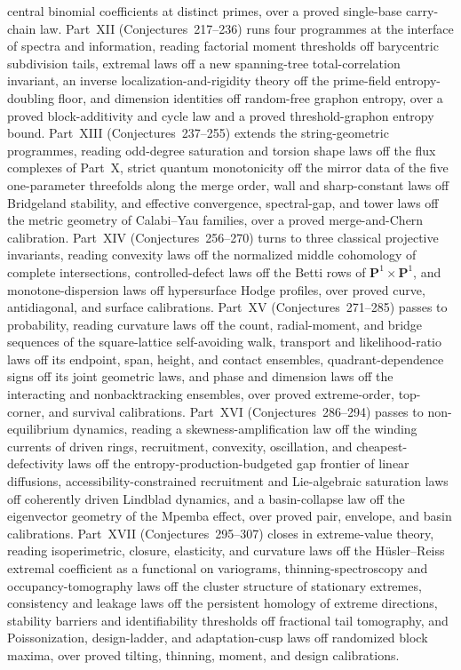 \documentclass[11pt]{article}
\theoremstyle{definition}
\begin{document}
central binomial coefficients at distinct primes, over a proved single-base carry-chain law.  Part~XII (Conjectures~217--236) runs four programmes at the interface of spectra and information, reading factorial moment thresholds off barycentric subdivision tails, extremal laws off a new spanning-tree total-correlation invariant, an inverse localization-and-rigidity theory off the prime-field entropy-doubling floor, and dimension identities off random-free graphon entropy, over a proved block-additivity and cycle law and a proved threshold-graphon entropy bound.  Part~XIII (Conjectures~237--255) extends the string-geometric programmes, reading odd-degree saturation and torsion shape laws off the flux complexes of Part~X, strict quantum monotonicity off the mirror data of the five one-parameter threefolds along the merge order, wall and sharp-constant laws off Bridgeland stability, and effective convergence, spectral-gap, and tower laws off the metric geometry of Calabi--Yau families, over a proved merge-and-Chern calibration.  Part~XIV (Conjectures~256--270) turns to three classical projective invariants, reading convexity laws off the normalized middle cohomology of complete intersections, controlled-defect laws off the Betti rows of $\mathbf P^1\times\mathbf P^1$, and monotone-dispersion laws off hypersurface Hodge profiles, over proved curve, antidiagonal, and surface calibrations.  Part~XV (Conjectures~271--285) passes to probability, reading curvature laws off the count, radial-moment, and bridge sequences of the square-lattice self-avoiding walk, transport and likelihood-ratio laws off its endpoint, span, height, and contact ensembles, quadrant-dependence signs off its joint geometric laws, and phase and dimension laws off the interacting and nonbacktracking ensembles, over proved extreme-order, top-corner, and survival calibrations.  Part~XVI (Conjectures~286--294) passes to non-equilibrium dynamics, reading a skewness-amplification law off the winding currents of driven rings, recruitment, convexity, oscillation, and cheapest-defectivity laws off the entropy-production-budgeted gap frontier of linear diffusions, accessibility-constrained recruitment and Lie-algebraic saturation laws off coherently driven Lindblad dynamics, and a basin-collapse law off the eigenvector geometry of the Mpemba effect, over proved pair, envelope, and basin calibrations.  Part~XVII (Conjectures~295--307) closes in extreme-value theory, reading isoperimetric, closure, elasticity, and curvature laws off the H\"usler--Reiss extremal coefficient as a functional on variograms, thinning-spectroscopy and occupancy-tomography laws off the cluster structure of stationary extremes, consistency and leakage laws off the persistent homology of extreme directions, stability barriers and identifiability thresholds off fractional tail tomography, and Poissonization, design-ladder, and adaptation-cusp laws off randomized block maxima, over proved tilting, thinning, moment, and design calibrations.
\end{document}
